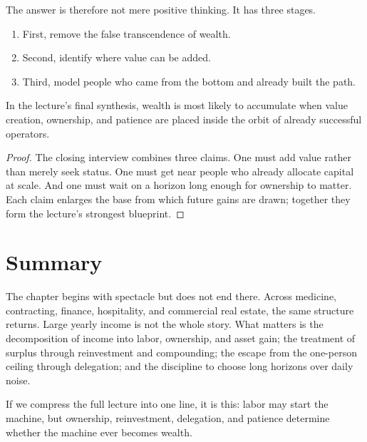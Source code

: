 The answer is therefore not mere positive thinking. It has three stages.
\begin{enumerate}
\item First, remove the false transcendence of wealth.
\item Second, identify where value can be added.
\item Third, model people who came from the bottom and already built the path.
\end{enumerate}

\begin{proposition}
In the lecture's final synthesis, wealth is most likely to accumulate when value creation, ownership, and patience are placed inside the orbit of already successful operators.
\end{proposition}

\begin{proof}
The closing interview combines three claims. One must add value rather than merely seek status. One must get near people who already allocate capital at scale. And one must wait on a horizon long enough for ownership to matter. Each claim enlarges the base from which future gains are drawn; together they form the lecture's strongest blueprint.
\end{proof}

\section{Summary}

The chapter begins with spectacle but does not end there. Across medicine, contracting, finance, hospitality, and commercial real estate, the same structure returns. Large yearly income is not the whole story. What matters is the decomposition of income into labor, ownership, and asset gain; the treatment of surplus through reinvestment and compounding; the escape from the one-person ceiling through delegation; and the discipline to choose long horizons over daily noise.

If we compress the full lecture into one line, it is this: labor may start the machine, but ownership, reinvestment, delegation, and patience determine whether the machine ever becomes wealth.